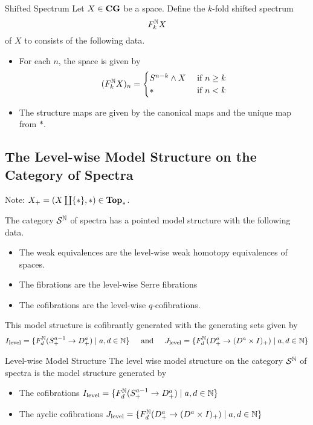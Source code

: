 \documentclass[a4paper]{article}
\begin{document}
\begin{defn}{Shifted Spectrum}{} Let $X\in\bold{CG}$ be a space. Define the $k$-fold shifted spectrum $$F_k^{\mathbb{N}} X$$ of $X$ to consists of the following data. 
\begin{itemize}
\item For each $n$, the space is given by $$(F_k^{\mathbb{N}} X)_n=\begin{cases}
S^{n-k}\wedge X & \text{ if } n\geq k\\
\ast & \text{ if } n<k
\end{cases}$$
\item The structure maps are given by the canonical maps and the unique map from $\ast$. 
\end{itemize}
\end{defn}

\subsection{The Level-wise Model Structure on the Category of Spectra}
Note: $X_+=(X\coprod\{\ast\},\ast)\in\bold{Top}_\ast$. 

\begin{thm}{}{} The category $\mathcal{S}^{\mathbb{N}}$ of spectra has a pointed model structure with the following data. 
\begin{itemize}
\item The weak equivalences are the level-wise weak homotopy equivalences of spaces. 
\item The fibrations are the level-wise Serre fibrations
\item The cofibrations are the level-wise $q$-cofibrations. 
\end{itemize}
This model structure is cofibrantly generated with the generating sets given by $$I_\text{level}=\{F_d^{\mathbb{N}}(S_+^{a-1}\to D_+^a)\;|\;a,d\in\mathbb{N}\}\;\;\;\;\text{ and }\;\;\;\; J_\text{level}=\{F_d^{\mathbb{N}}(D_+^a\to(D^a\times I)_+)\;|\;a,d\in\mathbb{N}\}$$
\end{thm}

\begin{defn}{Level-wise Model Structure}{} The level wise model structure on the category $\mathcal{S}^{\mathbb{N}}$ of spectra is the model structure generated by 
\begin{itemize}
\item The cofibrations $I_\text{level}=\{F_d^{\mathbb{N}}(S_+^{a-1}\to D_+^a)\;|\;a,d\in\mathbb{N}\}$
\item The ayclic cofibrations $J_\text{level}=\{F_d^{\mathbb{N}}(D_+^a\to(D^a\times I)_+)\;|\;a,d\in\mathbb{N}\}$
\end{itemize}
\end{defn}
\end{document}
